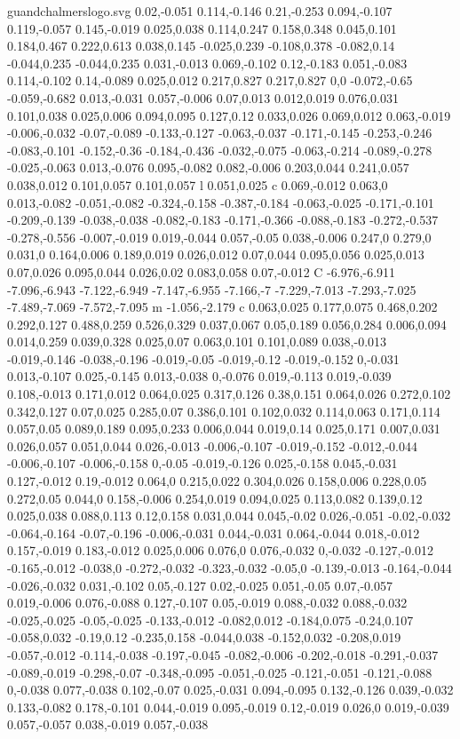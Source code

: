 \begin{filecontents}[noheader]{guandchalmerslogo.svg}
0.02,-0.051 0.114,-0.146 0.21,-0.253 0.094,-0.107 0.119,-0.057 0.145,-0.019 0.025,0.038 0.114,0.247 0.158,0.348 0.045,0.101 0.184,0.467 0.222,0.613 0.038,0.145 -0.025,0.239 -0.108,0.378 -0.082,0.14 -0.044,0.235 -0.044,0.235 0.031,-0.013 0.069,-0.102 0.12,-0.183 0.051,-0.083 0.114,-0.102 0.14,-0.089 0.025,0.012 0.217,0.827 0.217,0.827 0,0 -0.072,-0.65 -0.059,-0.682 0.013,-0.031 0.057,-0.006 0.07,0.013 0.012,0.019 0.076,0.031 0.101,0.038 0.025,0.006 0.094,0.095 0.127,0.12 0.033,0.026 0.069,0.012 0.063,-0.019 -0.006,-0.032 -0.07,-0.089 -0.133,-0.127 -0.063,-0.037 -0.171,-0.145 -0.253,-0.246 -0.083,-0.101 -0.152,-0.36 -0.184,-0.436 -0.032,-0.075 -0.063,-0.214 -0.089,-0.278 -0.025,-0.063 0.013,-0.076 0.095,-0.082 0.082,-0.006 0.203,0.044 0.241,0.057 0.038,0.012 0.101,0.057 0.101,0.057 l 0.051,0.025 c 0.069,-0.012 0.063,0 0.013,-0.082 -0.051,-0.082 -0.324,-0.158 -0.387,-0.184 -0.063,-0.025 -0.171,-0.101 -0.209,-0.139 -0.038,-0.038 -0.082,-0.183 -0.171,-0.366 -0.088,-0.183 -0.272,-0.537 -0.278,-0.556 -0.007,-0.019 0.019,-0.044 0.057,-0.05 0.038,-0.006 0.247,0 0.279,0 0.031,0 0.164,0.006 0.189,0.019 0.026,0.012 0.07,0.044 0.095,0.056 0.025,0.013 0.07,0.026 0.095,0.044 0.026,0.02 0.083,0.058 0.07,-0.012 C -6.976,-6.911 -7.096,-6.943 -7.122,-6.949 -7.147,-6.955 -7.166,-7 -7.229,-7.013 -7.293,-7.025 -7.489,-7.069 -7.572,-7.095 m -1.056,-2.179 c 0.063,0.025 0.177,0.075 0.468,0.202 0.292,0.127 0.488,0.259 0.526,0.329 0.037,0.067 0.05,0.189 0.056,0.284 0.006,0.094 0.014,0.259 0.039,0.328 0.025,0.07 0.063,0.101 0.101,0.089 0.038,-0.013 -0.019,-0.146 -0.038,-0.196 -0.019,-0.05 -0.019,-0.12 -0.019,-0.152 0,-0.031 0.013,-0.107 0.025,-0.145 0.013,-0.038 0,-0.076 0.019,-0.113 0.019,-0.039 0.108,-0.013 0.171,0.012 0.064,0.025 0.317,0.126 0.38,0.151 0.064,0.026 0.272,0.102 0.342,0.127 0.07,0.025 0.285,0.07 0.386,0.101 0.102,0.032 0.114,0.063 0.171,0.114 0.057,0.05 0.089,0.189 0.095,0.233 0.006,0.044 0.019,0.14 0.025,0.171 0.007,0.031 0.026,0.057 0.051,0.044 0.026,-0.013 -0.006,-0.107 -0.019,-0.152 -0.012,-0.044 -0.006,-0.107 -0.006,-0.158 0,-0.05 -0.019,-0.126 0.025,-0.158 0.045,-0.031 0.127,-0.012 0.19,-0.012 0.064,0 0.215,0.022 0.304,0.026 0.158,0.006 0.228,0.05 0.272,0.05 0.044,0 0.158,-0.006 0.254,0.019 0.094,0.025 0.113,0.082 0.139,0.12 0.025,0.038 0.088,0.113 0.12,0.158 0.031,0.044 0.045,-0.02 0.026,-0.051 -0.02,-0.032 -0.064,-0.164 -0.07,-0.196 -0.006,-0.031 0.044,-0.031 0.064,-0.044 0.018,-0.012 0.157,-0.019 0.183,-0.012 0.025,0.006 0.076,0 0.076,-0.032 0,-0.032 -0.127,-0.012 -0.165,-0.012 -0.038,0 -0.272,-0.032 -0.323,-0.032 -0.05,0 -0.139,-0.013 -0.164,-0.044 -0.026,-0.032 0.031,-0.102 0.05,-0.127 0.02,-0.025 0.051,-0.05 0.07,-0.057 0.019,-0.006 0.076,-0.088 0.127,-0.107 0.05,-0.019 0.088,-0.032 0.088,-0.032 -0.025,-0.025 -0.05,-0.025 -0.133,-0.012 -0.082,0.012 -0.184,0.075 -0.24,0.107 -0.058,0.032 -0.19,0.12 -0.235,0.158 -0.044,0.038 -0.152,0.032 -0.208,0.019 -0.057,-0.012 -0.114,-0.038 -0.197,-0.045 -0.082,-0.006 -0.202,-0.018 -0.291,-0.037 -0.089,-0.019 -0.298,-0.07 -0.348,-0.095 -0.051,-0.025 -0.121,-0.051 -0.121,-0.088 0,-0.038 0.077,-0.038 0.102,-0.07 0.025,-0.031 0.094,-0.095 0.132,-0.126 0.039,-0.032 0.133,-0.082 0.178,-0.101 0.044,-0.019 0.095,-0.019 0.12,-0.019 0.026,0 0.019,-0.039 0.057,-0.057 0.038,-0.019 0.057,-0.038 
\end{filecontents}

